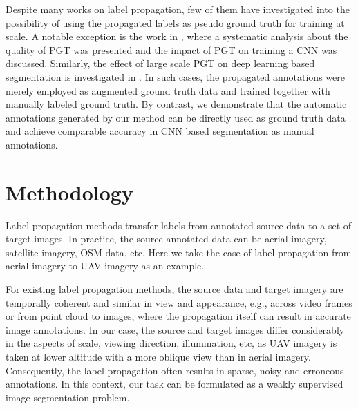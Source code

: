 Despite many works on label propagation, few of them have investigated into the possibility of using the propagated labels as pseudo ground truth for training at scale. A notable exception is the work in \cite{mustikovela2016can}, where a systematic analysis about the quality of PGT was presented and the impact of PGT on training a CNN was discussed. Similarly, the effect of large scale PGT on deep learning based segmentation is investigated in \cite{large2017}. In such cases, the propagated annotations were merely employed as augmented ground truth data and trained together with manually labeled ground truth. By contrast, we demonstrate that the automatic annotations generated by our method can be directly used as ground truth data and achieve comparable accuracy in CNN based segmentation as manual annotations.

\section{Methodology}
\label{sec:method}
Label propagation methods transfer labels from annotated source data to a set of target images. In practice, the source annotated data can be aerial imagery, satellite imagery, OSM data, etc. Here we take the case of label propagation from aerial imagery to UAV imagery as an example.

For existing label propagation methods, the source data and target imagery are temporally coherent and similar in view and appearance, e.g., across video frames or from point cloud to images, where the propagation itself can result in accurate image annotations. In our case, the source and target images differ considerably in the aspects of scale, viewing direction, illumination, etc, as UAV imagery is taken at lower altitude with a more oblique view than in aerial imagery. Consequently, the label propagation often results in sparse, noisy and erroneous annotations. In this context, our task can be formulated as a weakly supervised image segmentation problem. 

